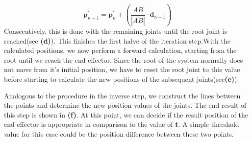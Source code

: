 \begin{equation}
\textbf{p}_{n-1}^{'}= \textbf{p}_{n}^{'}+ \left(\frac{\overline{AB}}{|\overline{AB}|}\cdot\textbf{d}_{n-1}\right)
\end{equation}
Consecutively, this is done with the remaining joints until the root joint is reached(see \textbf{(d)}).
This finishes the first halve of the iteration step.With the calculated positions, we now perform a forward calculation, starting from the root until we reach the end effector. Since the root of the system normally does not move from it's initial position, we have to reset the root joint to this value before starting to calculate the new positions of the subsequent joints(see\textbf{(e)}).

Analogous to the procedure in the inverse step, we construct the lines between the points and determine the new position values of the joints. The end result of this step is shown in \textbf{(f)}. At this point, we can decide if the result position of the end effector is appropriate in comparison to the value of \textbf{t}. A simple threshold value for this case could be the position difference between these two points.
